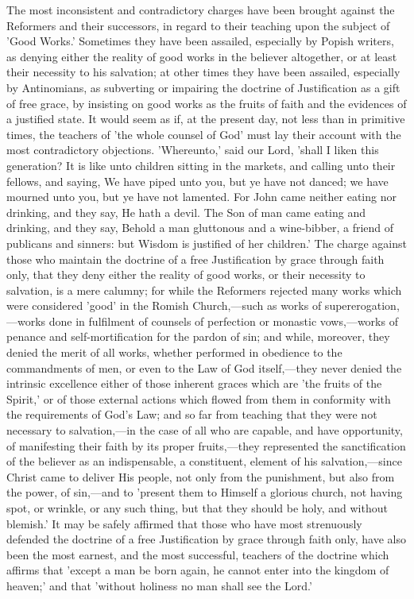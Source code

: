 \documentclass[
]{book}
\begin{document}
The most inconsistent and contradictory charges have been brought against the Reformers and their successors, in regard to their teaching upon the subject of 'Good Works.' Sometimes they have been assailed, especially by Popish writers, as denying either the reality of good works in the believer altogether, or at least their necessity to his salvation; at other times they have been assailed, especially by Antinomians, as subverting or impairing the doctrine of Justification as a gift of free grace, by insisting on good works as the fruits of faith and the evidences of a justified state. It would seem as if, at the present day, not less than in primitive times, the teachers of 'the whole counsel of God' must lay their account with the most contradictory objections. 'Whereunto,' said our Lord, 'shall I liken this generation? It is like unto children sitting in the markets, and calling unto their fellows, and saying, We have piped unto you, but ye have not danced; we have mourned unto you, but ye have not lamented. For John came neither eating nor drinking, and they say, He hath a devil. The Son of man came eating and drinking, and they say, Behold a man gluttonous and a wine-bibber, a friend of publicans and sinners: but Wisdom is justified of her children.' The charge against those who maintain the doctrine of a free Justification by grace through faith only, that they deny either the reality of good works, or their necessity to salvation, is a mere calumny; for while the Reformers rejected many works which were considered 'good' in the Romish Church,---such as works of supererogation,---works done in fulfilment of counsels of perfection or monastic vows,---works of penance and self-mortification for the pardon of sin; and while, moreover, they denied the merit of all works, whether performed in obedience to the commandments of men, or even to the Law of God itself,---they never denied the intrinsic excellence either of those inherent graces which are 'the fruits of the Spirit,' or of those external actions which flowed from them in conformity with the requirements of God's Law; and so far from teaching that they were not necessary to salvation,---in the case of all who are capable, and have opportunity, of manifesting their faith by its proper fruits,---they represented the sanctification of the believer as an indispensable, a constituent, element of his salvation,---since Christ came to deliver His people, not only from the punishment, but also from the power, of sin,---and to 'present them to Himself a glorious church, not having spot, or wrinkle, or any such thing, but that they should be holy, and without blemish.' It may be safely affirmed that those who have most strenuously defended the doctrine of a free Justification by grace through faith only, have also been the most earnest, and the most successful, teachers of the doctrine which affirms that 'except a man be born again, he cannot enter into the kingdom of heaven;' and that 'without holiness no man shall see the Lord.'
\end{document}
